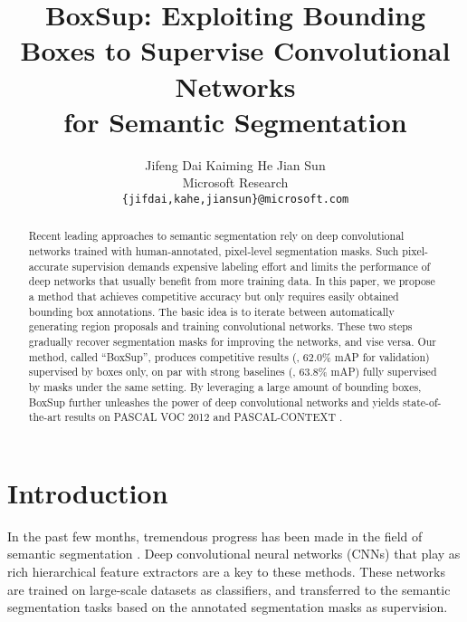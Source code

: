 \documentclass[10pt,twocolumn,letterpaper]{article}
\begin{document}
\title{BoxSup: Exploiting Bounding Boxes to Supervise Convolutional Networks \\ for Semantic Segmentation}

\author{Jifeng Dai \qquad\qquad Kaiming He \qquad\qquad Jian Sun \vspace{8pt}\\
Microsoft Research\\
{\tt\small \{jifdai,kahe,jiansun\}@microsoft.com}
}


\maketitle

\begin{abstract}
Recent leading approaches to semantic segmentation rely on deep convolutional networks trained with
human-annotated, pixel-level segmentation masks. Such pixel-accurate supervision demands expensive labeling effort and limits the performance of deep networks that usually benefit from more training data. In this paper, we propose a method that achieves competitive accuracy but only requires easily obtained bounding box annotations. The basic idea is to iterate between automatically generating region proposals and training convolutional networks. These two steps gradually recover segmentation masks for improving the networks, and vise versa.
Our method, called ``BoxSup'', produces competitive results (\eg, 62.0\% mAP for validation) supervised by boxes only, on par with strong baselines (\eg, 63.8\% mAP) fully supervised by masks under the same setting.
By leveraging a large amount of bounding boxes, BoxSup further unleashes the power of deep convolutional networks and yields state-of-the-art results on PASCAL VOC 2012 and PASCAL-CONTEXT \cite{mottaghi2014role}.
\end{abstract}

\section{Introduction}

In the past few months, tremendous progress has been made in the field of semantic segmentation \cite{hariharan2014simultaneous,Long2015,Hariharan2015,Dai2015,Chen2015,mostajabi2014feedforward}. Deep convolutional neural networks (CNNs) \cite{lecun1989backpropagation,krizhevsky2012imagenet} that play as rich hierarchical feature extractors are a key to these methods. These networks are trained on large-scale datasets \cite{deng2009imagenet,Russakovsky2014} as classifiers, and transferred to the semantic segmentation tasks based on the annotated segmentation masks as supervision.
\end{document}
